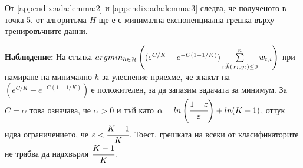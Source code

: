 \documentclass[main.tex]{subfiles}
\begin{document}
От \autoref{appendix:ada:lemma:2} и \autoref{appendix:ada:lemma:3} следва, че полученото в точка 5. от алгоритъма $H$ ще е с минимална експоненциална грешка върху тренировъчните данни.

{\footnotesize \textbf{Наблюдение:} На стъпка} {\normalsize $argmin_{h\in \mathcal{H}} \left( (e^{C/K} - e^{-C(1 - 1/K)}) \sum\limits_{i: \tilde{h}(x_i, y_i) \leq 0}^n w_{t, i}\right)$} {\footnotesize при намиране на минимално $h$ за улеснение приехме, че знакът на} {\normalsize $(e^{C/K} - e^{-C(1 - 1/K)})\ $}{\footnotesize  е положителен, за да запазим задачата за минимум. За $C=\alpha$ това означава, че $\alpha > 0$ и тъй като $\alpha = ln\left(\cfrac{1 - \varepsilon}{\varepsilon}\right) + ln(K-1)$, оттук идва ограничението, че $\varepsilon < \cfrac{K-1}{K}$. Тоест, грешката на всеки от класификаторите не трябва да надхвърля $\cfrac{K-1}{K}$}.
\end{document}
